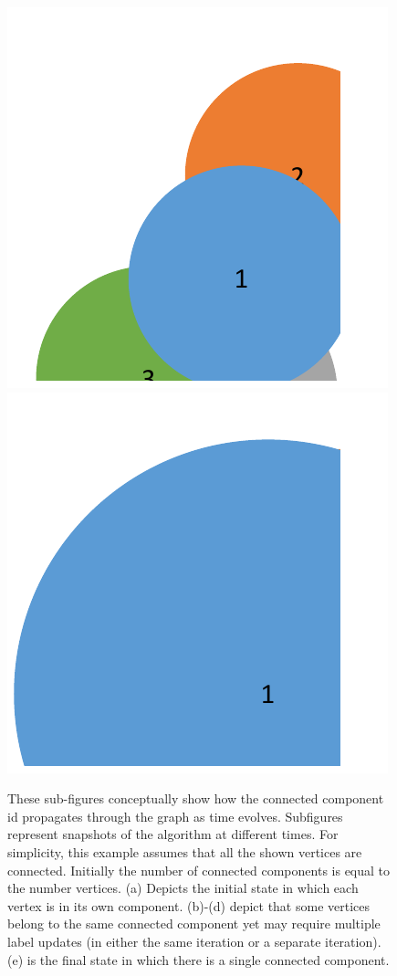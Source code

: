 \begin{figure}
\includegraphics[width=0.2\paperwidth]{figure/sv4}
\includegraphics[width=0.2\paperwidth]{figure/sv5}
\caption{
\label{fig:svalgm}
These sub-figures conceptually show how the connected component id
propagates through the graph as time evolves. Subfigures represent
snapshots of the algorithm at different times. For simplicity, this
example assumes that all the shown vertices are connected. Initially
the number of connected components is equal to the number vertices.
(a) Depicts the initial state in which each vertex is in its own component.
(b)-(d) depict that some vertices belong to the same connected component
yet may require multiple label updates (in either the same iteration
or a separate iteration). (e) is the final state in which there is
a single connected component.}

\end{figure}

